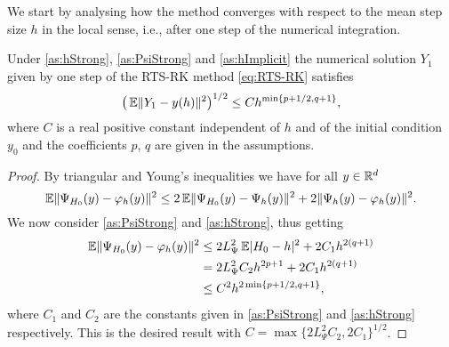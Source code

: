 \documentclass[10pt]{article}
\begin{document}
We start by analysing how the method converges with respect to the mean step size $h$ in the local sense, i.e., after one step of the numerical integration.
\begin{lemma}\label{thm:StrongOrderLocal} Under \cref{as:hStrong}, \cref{as:PsiStrong} and \cref{as:hImplicit} the numerical solution $Y_1$ given by one step of the RTS-RK method \eqref{eq:RTS-RK} satisfies 
	\begin{equation}\label{eq:StrongOrderLocal}
		\big(\operatorname{\mathbb{E}}\lVert Y_1 - y(h)\rVert^2\big)^{1/2} \leq C h^{\min\{p+1/2, q + 1\}},
	\end{equation}
	where $C$ is a real positive constant independent of $h$ and of the initial condition $y_0$ and the coefficients $p$, $q$ are given in the assumptions.
\end{lemma}
\begin{proof} By triangular and Young's inequalities we have for all $y \in \mathbb{R}^d$ 
	\begin{equation}
		\operatorname{\mathbb{E}}\lVert\Psi_{H_0}(y) - \varphi_h(y)\rVert^2 \leq 2\operatorname{\mathbb{E}}\lVert\Psi_{H_0}(y) - \Psi_h(y)\rVert^2 + 2\lVert\Psi_h(y) - \varphi_h(y)\rVert^2.
	\end{equation}		
	We now consider \cref{as:PsiStrong} and \cref{as:hStrong}, thus getting
	\begin{equation}\label{eq:LocalErrorDecomposition}
	\begin{aligned}
		\operatorname{\mathbb{E}}\lVert\Psi_{H_0}(y) - \varphi_h(y)\rVert^2 &\leq 2L_{\Psi}^2 \operatorname{\mathbb{E}}\lvert H_0 - h\rvert^2 + 2C_1 h^{2(q+1)} \\
		&= 2L_{\Psi}^2 C_2 h^{2p+1} + 2 C_1 h^{2(q+1)} \\
		&\leq C^2 h^{2\min\{p+1/2,q+1\}},
	\end{aligned}
	\end{equation}
	where $C_1$ and $C_2$ are the constants given in \cref{as:PsiStrong} and \cref{as:hStrong} respectively. This is the desired result with $C = \max\{2L_{\Psi}^2 C_2, 2 C_1\}^{1/2}$.
\end{proof}
\end{document}
